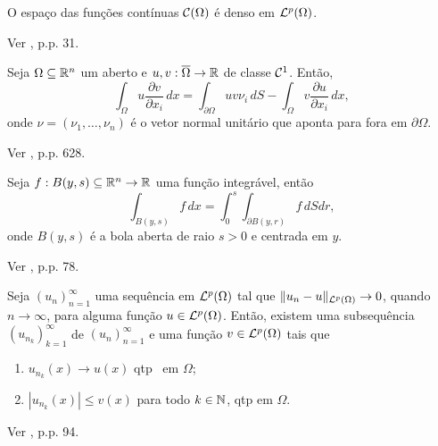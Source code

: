 \begin{tbox} \label{thm:densidadeC}
    O espaço das funções contínuas $\mathcal{C}(\Omega)$ é denso em $\mathcal{L}^p(\Omega)$.
\end{tbox}
\begin{prf}
    Ver \cite{adams-sobolev}, p.p. 31.
\end{prf}


\begin{tbox} \label{thm:integracao-por-partes}
    Seja $\Omega \subseteq \mathbb{R}^n$ um aberto e $u, v : \overline\Omega \to \mathbb{R}$ de classe $\mathcal{C}^1$. 
    Então,
    \[
        \int_\Omega u \dfrac{\partial v}{\partial x_i} \,dx = \int_{\partial\Omega} uv \nu_i \, dS- \int_\Omega v \dfrac{\partial u}{\partial x_i} \,dx,
    \]
    onde $\nu = (\nu_1,\dots,\nu_n)$ é o vetor normal unitário que aponta para fora em $\partial\Omega$.   
\end{tbox}
\begin{prf}
    Ver \Cite{evans-pde}, p.p. 628.
\end{prf}

\begin{tbox} \label{thm:coordenadas-polares}
    Seja $f : B(y,s) \subseteq \mathbb{R}^n \to \mathbb{R}$ uma função integrável, então
    \[
        \int_{B(y,s)} f \,dx = \int_0^s\int_{\partial B(y,r)} f \,dS dr,
    \]
    onde $B(y,s)$ é a bola aberta de raio $s > 0$ e centrada em $y$.
\end{tbox}
\begin{prf}
    Ver \cite{folland-real.analysis}, p.p. 78.
\end{prf}

\begin{tbox} \label{thm:teorema-do-brezis}
    Seja $(u_n)_{n=1}^\infty$ uma sequência em $\mathcal{L}^p(\Omega)$ tal que $\Vert u_n - u \Vert_{\mathcal{L}^p(\Omega)} \to 0$, quando $n \to \infty$, para alguma função $u \in \mathcal{L}^p(\Omega)$.
    Então, existem uma subsequência $(u_{n_k})_{k=1}^\infty$ de $(u_n)_{n=1}^\infty$ e uma função $v \in \mathcal{L}^p(\Omega)$ tais que
    \begin{enumerate}[label=\textbf{(\alph*)}, leftmargin=*]
        \item $u_{n_k}(x) \to u(x)$ qtp\footnotemark ~ em $\Omega$;
        \item $|u_{n_k}(x)| \leqslant v(x)$ para todo $k \in \mathbb{N}$, qtp em $\Omega$.
    \end{enumerate}
\end{tbox}
\begin{prf}
    Ver \cite{brezis-functional.analysis}, p.p. 94.
\end{prf}

